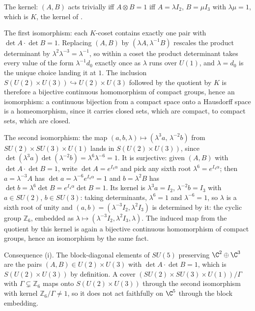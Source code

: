 The kernel: $(A, B)$ acts trivially iff $A \otimes B = 1$ iff $A = \lambda I_{2}$, $B = \mu I_{3}$ with $\lambda\mu = 1$, which is $K$, the kernel of .

The first isomorphism: each $K$-coset contains exactly one pair with $\det A \cdot \det B = 1$. Replacing $(A, B)$ by $(\lambda A, \lambda^{-1}B)$ rescales the product determinant by $\lambda^{2}\lambda^{-3} = \lambda^{-1}$, so within a coset the product determinant takes every value of the form $\lambda^{-1}d_{0}$ exactly once as $\lambda$ runs over $U(1)$, and $\lambda = d_{0}$ is the unique choice landing it at $1$. The inclusion $S(U(2) \times U(3)) \hookrightarrow U(2) \times U(3)$ followed by the quotient by $K$ is therefore a bijective continuous homomorphism of compact groups, hence an isomorphism: a continuous bijection from a compact space onto a Hausdorff space is a homeomorphism, since it carries closed sets, which are compact, to compact sets, which are closed.

The second isomorphism: the map $(a, b, \lambda) \mapsto (\lambda^{3}a,\, \lambda^{-2}b)$ from $SU(2) \times SU(3) \times U(1)$ lands in $S(U(2) \times U(3))$, since $\det(\lambda^{3}a)\det(\lambda^{-2}b) = \lambda^{6}\lambda^{-6} = 1$. It is surjective: given $(A, B)$ with $\det A \cdot \det B = 1$, write $\det A = e^{I_{4}\alpha}$ and pick any sixth root $\lambda^{6} = e^{I_{4}\alpha}$; then $a = \lambda^{-3}A$ has $\det a = \lambda^{-6}e^{I_{4}\alpha} = 1$ and $b = \lambda^{2}B$ has $\det b = \lambda^{6}\det B = e^{I_{4}\alpha}\det B = 1$. Its kernel is $\lambda^{3}a = I_{2}$, $\lambda^{-2}b = I_{3}$ with $a \in SU(2)$, $b \in SU(3)$: taking determinants, $\lambda^{6} = 1$ and $\lambda^{-6} = 1$, so $\lambda$ is a sixth root of unity and $(a, b) = (\lambda^{-3}I_{2}, \lambda^{2}I_{3})$ is determined by it: the cyclic group $\mathbb{Z}_{6}$, embedded as $\lambda \mapsto (\lambda^{-3}I_{2}, \lambda^{2}I_{3}, \lambda)$. The induced map from the quotient by this kernel is again a bijective continuous homomorphism of compact groups, hence an isomorphism by the same fact.

Consequence (i). The block-diagonal elements of $SU(5)$ preserving $\C^{2} \oplus \C^{3}$ are the pairs $(A, B) \in U(2) \times U(3)$ with $\det A \cdot \det B = 1$, which is $S(U(2) \times U(3))$ by definition. A cover $(SU(2) \times SU(3) \times U(1))/\Gamma$ with $\Gamma \subsetneq \mathbb{Z}_{6}$ maps onto $S(U(2) \times U(3))$ through the second isomorphism with kernel $\mathbb{Z}_{6}/\Gamma \neq 1$, so it does not act faithfully on $\C^{5}$ through the block embedding.

